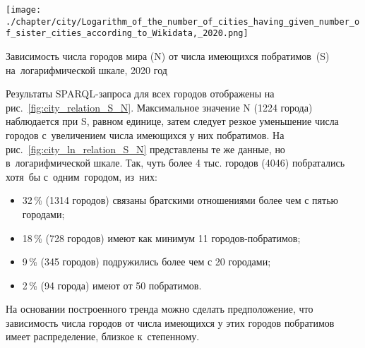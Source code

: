 \begin{marginfigure}[8pt]
\texttt{[image: ./chapter/city/Logarithm\_of\_the\_number\_of\_cities\_having\_given\_number\_of\_sister\_cities\_according\_to\_Wikidata,\_2020.png]}%
    \caption[Зависимость числа городов от числа имеющихся побратимов на логарифмической шкале, 2020 год.]
    {Зависимость числа городов мира (N) от числа имеющихся побратимов~(S) на~логарифмической шкале, 2020 год}%
\label{fig:city_ln_relation_S_N}%
\end{marginfigure}

Результаты SPARQL-запроса для всех городов отображены на рис.~\ref{fig:city_relation_S_N}. 
Максимальное значение N (\num{1224} города) наблюдается при S, равном единице, 
затем следует резкое уменьшение числа городов с~увеличением числа имеющихся у них побратимов. 
На рис.~\ref{fig:city_ln_relation_S_N} представлены те же данные, но в~логарифмической шкале. 
Так, чуть более 4 тыс. городов (\num{4046}) побратались хотя~бы с~одним~городом, из~них:
%
\begin{itemize}
\item 32\,\% (\num{1314} городов) связаны братскими отношениями более чем с пятью городами;
\item 18\,\% (728 городов) имеют как минимум 11 городов-побратимов;
\item 9\,\% (345 городов) подружились более чем с 20 городами;
\item 2\,\% (94 города) имеют от 50 побратимов.
\end{itemize}

На основании построенного тренда можно сделать предположение, 
что зависимость числа городов от числа имеющихся у этих городов побратимов 
имеет распределение, близкое к~степенному.

%

